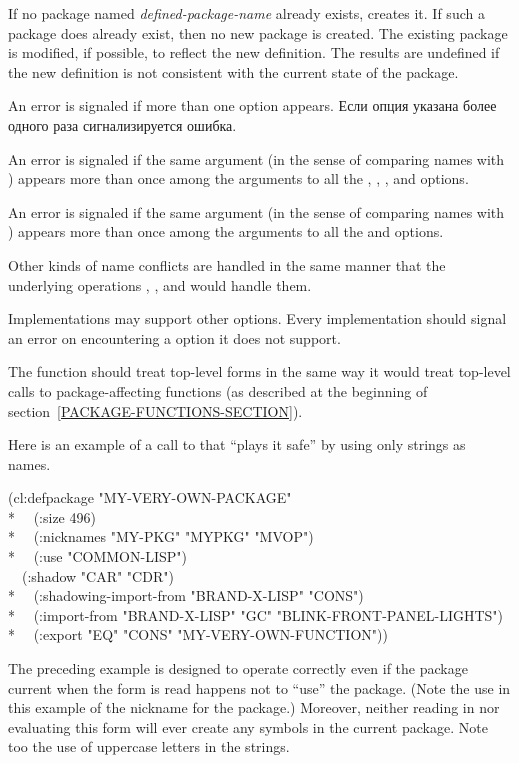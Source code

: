 \begin{defmac}
If no package named \emph{defined-package-name} already exists,
 creates it.  If such a package does already exist,
then no new package is created.  The existing package is
modified, if possible, to reflect the new definition.  The results are
undefined if the new definition is not consistent with the current
state of the package.

An error is signaled if more than one  option appears.
Если опция  указана более одного раза сигнализируется ошибка.

An error is signaled if the same  argument (in the sense
of comparing names with ) appears more than once among
the arguments to all the , ,
, and  options.

An error is signaled if the same  argument (in the sense
of comparing names with ) appears more than once among
the arguments to all the  and  options.

Other kinds of name conflicts are handled in the same manner that
the underlying operations , , and 
would handle them.

Implementations may support other  options.
Every implementation should signal an error on encountering
a  option it does not support.

The function  should treat top-level 
forms in the same way it would treat top-level calls to package-affecting
functions (as described at the beginning of
section~\ref{PACKAGE-FUNCTIONS-SECTION}).

Here is an example of a call to  that ``plays it safe''
by using only strings as names.
\begin{lisp}
(cl:defpackage "MY-VERY-OWN-PACKAGE" \\*
~~(:size 496) \\*
~~(:nicknames "MY-PKG" "MYPKG" "MVOP") \\*
~~(:use "COMMON-LISP") \\
~~(:shadow "CAR" "CDR") \\*
~~(:shadowing-import-from "BRAND-X-LISP" "CONS") \\*
~~(:import-from "BRAND-X-LISP" "GC" "BLINK-FRONT-PANEL-LIGHTS") \\*
~~(:export "EQ" "CONS" "MY-VERY-OWN-FUNCTION"))
\end{lisp}
The preceding  example is designed to operate correctly
even if the package current when the form is read happens not to
``use'' the  package.  (Note the use in this example
of the nickname  for the  package.)
Moreover, neither reading in nor evaluating
this  form will ever create any symbols in the
current package.  Note too the use of uppercase letters in the strings.


\end{defmac}
